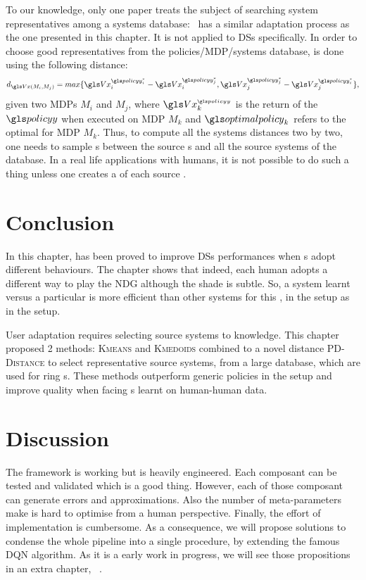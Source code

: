 To our knowledge, only one paper treats the subject of searching system representatives among a systems database:~\parencite{mahmud2013} has a similar adaptation process as the one presented in this chapter. It is not applied to \glspl{DS} specifically. In order to choose good representatives from the policies/MDP/systems database,  is done using the following distance:
\begin{equation*}
    d_{\V(M_i,M_j)} = max\{\V_i^{\policy_i^*}-\V_i^{\policy_j^*},\V_j^{\policy_j^*}-\V_j^{\policy_i^*}\},
\end{equation*}
given two \glspl{MDP} $M_i$ and $M_j$, where $\V_k^{_{\policy}}$ is the return of the  $\policy$ when executed on \gls{MDP} $M_k$ and $\optimalpolicy_k$ refers to the optimal  for \gls{MDP} $M_k$. Thus, to compute all the systems distances two by two, one needs to sample s between the source s and all the source systems of the database. In a real life  applications with humans, it is not possible to do such a thing unless one creates a  of each source .

\section{Conclusion}
%

In this chapter,  has been proved to improve \glspl{DS} performances when s adopt different behaviours. The chapter shows that indeed, each human adopts a different way to play the \gls{NDG} although the shade is subtle. So, a system learnt versus a particular  is more efficient than other systems for this , in the  setup as in the  setup.

User adaptation requires selecting source systems to  knowledge. This chapter proposed 2 methods: \textsc{Kmeans} and \textsc{Kmedoids} combined to a novel distance \textsc{PD-Distance} to select representative source systems, from a large database, which are used for ring  s. These methods outperform generic policies in the  setup and improve  quality when facing s learnt on human-human data.

\section{Discussion}

The framework is working but is heavily engineered. Each composant can be tested and validated which is a good thing. However, each of those composant can generate errors and approximations. Also the number of meta-parameters make is hard to optimise from a human perspective. Finally, the effort of implementation is cumbersome. As a consequence, we will propose solutions to condense the whole pipeline into a single procedure, by extending the famous \gls{DQN} algorithm. As it is a early work in progress, we will see those propositions in an extra chapter, ~.
